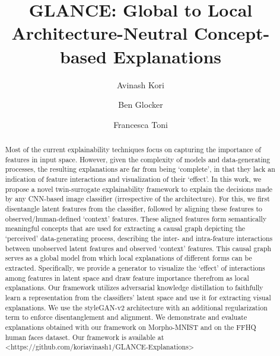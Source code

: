 \documentclass[sigconf]{acmart}\usepackage{booktabs}
\author{Avinash Kori}\affiliation{\institution{Department of Computing}\country{}}\email{a.kori21@ic.ac.uk}\author{Ben Glocker}\affiliation{\institution{Department of Computing}\country{}}\email{b.glocker@ic.ac.uk}\author{Francesca Toni}\affiliation{\institution{Department of Computing}\country{}}\email{f.toni@ic.ac.uk}
\begin{document}
\title{GLANCE: Global to Local Architecture-Neutral Concept-based Explanations}

\begin{abstract}
Most of the current explainability techniques focus on capturing the importance of features in input space. However, given the complexity of models and data-generating processes, the resulting explanations are far from being `complete', in that they lack an indication of feature interactions and visualization of their `effect'. In this work, we propose a novel twin-surrogate explainability framework to explain the decisions made by any CNN-based image classifier (irrespective of the architecture). For this, we first disentangle latent features from the classifier, followed by aligning these features to observed/human-defined `context' features. These aligned features form semantically meaningful concepts that are used for extracting a causal graph depicting the `perceived' data-generating process, describing the inter- and intra-feature interactions between unobserved latent features and observed `context' features. This causal graph serves as a global model from which local explanations of different forms can be extracted. Specifically, we provide a generator to visualize the `effect' of interactions among features in latent space and draw feature importance therefrom as local explanations. Our framework utilizes adversarial knowledge distillation to faithfully learn a representation from the classifiers' latent space and use it for extracting visual explanations. We use the styleGAN-v2 architecture with an additional regularization term to enforce disentanglement and alignment. We demonstrate and evaluate explanations obtained with our framework on Morpho-MNIST and on the FFHQ human faces dataset. Our framework is available at <https://github.com/koriavinash1/GLANCE-Explanations>
\end{abstract}


\maketitle
\end{document}

